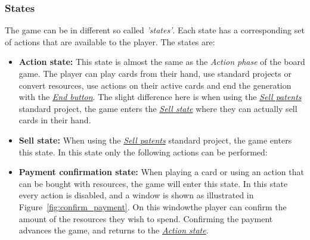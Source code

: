\subsubsection{States}
\label{user:usage:state}

The game can be in different so called \textit{'states'}. Each state has a corresponding set of actions that are available to the player. The states are:

\begin{itemize}
    \item \textbf{Action state:}\label{user:usage:action_state} This state is almost the same as the \textit{Action phase} of the board game. The player can play cards from their hand, use standard projects or convert resources, use actions on their active cards and end the generation with the \hyperref[user:usage:end]{\textit{End button}}. The slight difference here is when using the \hyperref[user:usage:sell]{\textit{Sell patents}} standard project, the game enters the \hyperref[user:usage:sell_state]{\textit{Sell state}} where they can actually sell cards in their hand.

    \item \textbf{Sell state:}\label{user:usage:sell_state} When using the \hyperref[user:usage:sell]{\textit{Sell patents}} standard project, the game enters this state. In this state only the following actions can be performed:

    \item \textbf{Payment confirmation state:} When playing a card or using an action that can be bought with resources, the game will enter this state. In this state every action is disabled, and a window is shown as illustrated in Figure~\ref{fig:confirm_payment}. On this windowthe player can confirm the amount of the resources they wish to spend. Confirming the payment advances the game, and returns to the \hyperref[user:usage:action_state]{\textit{Action state}}.


\end{itemize}
